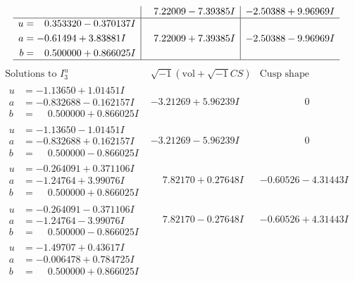 \documentclass[1p]{elsarticle_modified}
\theoremstyle{definition}
\newcommand{\I}{\sqrt{-1}}
\begin{document}
$$\begin{array}{c|c|c}
 & \phantom{-}7.22009 - 7.39385 I & -2.50388 + 9.96969 I \\ \hline\begin{aligned}
u &= \phantom{-}0.353320 - 0.370137 I \\
a &= -0.61494 + 3.83881 I \\
b &= \phantom{-}0.500000 + 0.866025 I\end{aligned}
 & \phantom{-}7.22009 + 7.39385 I & -2.50388 - 9.96969 I\\
 \hline 
 \end{array}$$\newpage$$\begin{array}{c|c|c}  
\text{Solutions to }I^u_{3}& \I (\text{vol} + \sqrt{-1}CS) & \text{Cusp shape}\\
 \hline 
\begin{aligned}
u &= -1.13650 + 1.01451 I \\
a &= -0.832688 - 0.162157 I \\
b &= \phantom{-}0.500000 + 0.866025 I\end{aligned}
 & -3.21269 + 5.96239 I & \phantom{-0.000000 } 0 \\ \hline\begin{aligned}
u &= -1.13650 - 1.01451 I \\
a &= -0.832688 + 0.162157 I \\
b &= \phantom{-}0.500000 - 0.866025 I\end{aligned}
 & -3.21269 - 5.96239 I & \phantom{-0.000000 } 0 \\ \hline\begin{aligned}
u &= -0.264091 + 0.371106 I \\
a &= -1.24764 + 3.99076 I \\
b &= \phantom{-}0.500000 + 0.866025 I\end{aligned}
 & \phantom{-}7.82170 + 0.27648 I & -0.60526 - 4.31443 I \\ \hline\begin{aligned}
u &= -0.264091 - 0.371106 I \\
a &= -1.24764 - 3.99076 I \\
b &= \phantom{-}0.500000 - 0.866025 I\end{aligned}
 & \phantom{-}7.82170 - 0.27648 I & -0.60526 + 4.31443 I \\ \hline\begin{aligned}
u &= -1.49707 + 0.43617 I \\
a &= -0.006478 + 0.784725 I \\
b &= \phantom{-}0.500000 + 0.866025 I\end{aligned}

\end{array}$$
\end{document}
